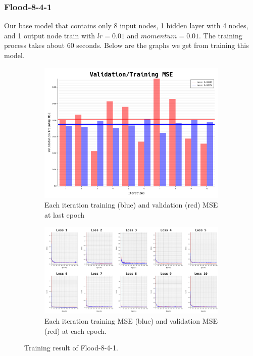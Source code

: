 \documentclass{article}
\begin{document}
\subsubsection*{Flood-8-4-1}
Our base model that contains only 8 input nodes, 1 hidden layer with 4 nodes, and 1 output node train with $lr = 0.01$ and $momentum = 0.01$.
The training process takes about $60$ seconds. Below are the graphs we get from training this model. 
\begin{figure}[ht]
	\begin{subfigure}{\textwidth}
		\centering
		\includegraphics[scale=0.3]{flood-8-4-1/cv_l}
		\caption{Each iteration training (blue) and validation (red) MSE at last epoch}
		\label{fig:2a}
	\end{subfigure}
	\begin{subfigure}{\textwidth}
		\includegraphics[width=\textwidth]{flood-8-4-1/loss}
		\caption{Each iteration training MSE (blue) and validation MSE (red) at each epoch.}
		\label{fig:2b}
	\end{subfigure}
	\caption{Training result of Flood-8-4-1.}
	\label{fig:2}
\end{figure}
\FloatBarrier
\end{document}
